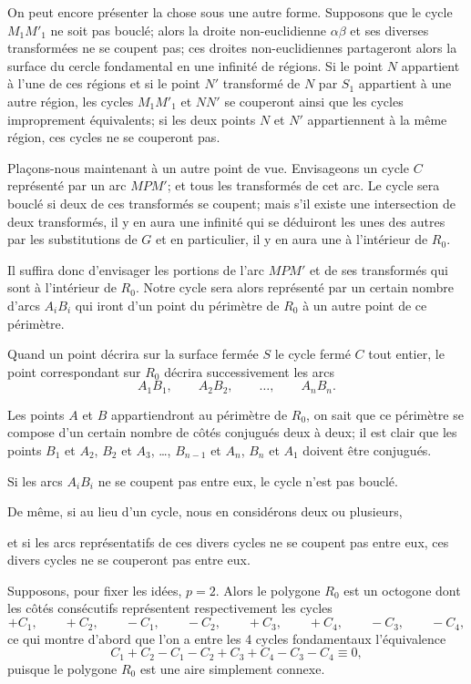 \documentclass{article}
\begin{document}
On peut encore présenter la chose sous une autre forme. Supposons que le cycle $M_{1}M'_{1}$ ne soit pas bouclé; alors la droite non-euclidienne $\alpha\beta$ et ses diverses transformées ne se coupent pas; ces droites non-euclidiennes partageront alors la surface du cercle fondamental en une infinité de régions. Si le point $N$ appartient à l'une de ces régions et si le point $N'$ transformé de $N$ par $S_{1}$ appartient à une autre région, les cycles $M_{1}M'_{1}$ et $NN'$ se couperont ainsi que les cycles improprement équivalents; si les deux points $N$ et $N'$ appartiennent à la même région, ces cycles ne se couperont pas.

Plaçons-nous maintenant à un autre point de vue. Envisageons un cycle $C$ représenté par un arc $MPM'$; et tous les transformés de cet arc. Le cycle sera bouclé si deux de ces transformés se coupent; mais s'il existe une intersection de deux transformés, il y en aura une infinité qui se déduiront les unes des autres par les substitutions de $G$ et en particulier, il y en aura une à l'intérieur de $R_{0}$.

Il suffira donc d'envisager les portions de l'arc $MPM'$ et de ses transformés qui sont à l'intérieur de $R_{0}$. Notre cycle sera alors représenté par un certain nombre d'arcs $A_{i}B_{i}$ qui iront d'un point du périmètre de $R_{0}$ à un autre point de ce périmètre.

Quand un point décrira sur la surface fermée $S$ le cycle fermé $C$ tout entier, le point correspondant sur $R_{0}$ décrira successivement les arcs
\[ A_{1}B_{1}, \qquad A_{2}B_{2}, \qquad \ldots, \qquad A_{n}B_{n}. \]

Les points $A$ et $B$ appartiendront au périmètre de $R_{0}$, on sait que ce périmètre se compose d'un certain nombre de côtés conjugués deux à deux; il est clair que les points $B_{1}$ et $A_{2}$, $B_{2}$ et $A_{3}$, \ldots, $B_{n-1}$ et $A_{n}$, $B_{n}$ et $A_{1}$ doivent être conjugués.

Si les arcs $A_{i}B_{i}$ ne se coupent pas entre eux, le cycle n'est pas bouclé.

De même, si au lieu d'un cycle, nous en considérons deux ou plusieurs,

et si les arcs représentatifs de ces divers cycles ne se coupent pas entre eux, ces divers cycles ne se couperont pas entre eux.

Supposons, pour fixer les idées, $p = 2$. Alors le polygone $R_{0}$ est un octogone dont les côtés consécutifs représentent respectivement les cycles
\[ +C_{1}, \qquad +C_{2}, \qquad -C_{1}, \qquad -C_{2}, \qquad +C_{3}, \qquad +C_{4}, \qquad -C_{3}, \qquad -C_{4}, \]
ce qui montre d'abord que l'on a entre les 4 cycles fondamentaux l'équivalence
\[ C_{1} + C_{2} - C_{1} - C_{2} + C_{3} + C_{4} - C_{3} - C_{4} \equiv 0, \tag{26} \]
puisque le polygone $R_{0}$ est une aire simplement connexe.
\end{document}
